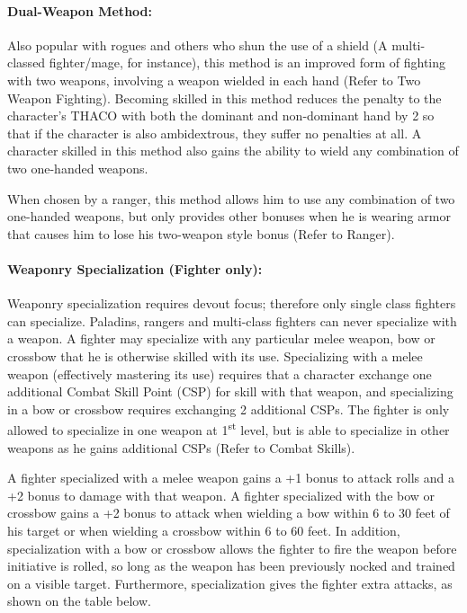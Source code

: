 \begin{multicols}{2}
\paragraph{Dual-Weapon Method:} Also popular with rogues and others who shun the use of a shield (A multi-classed fighter/mage, for instance), this method is an improved form of fighting with two weapons, involving a weapon wielded in each hand (Refer to Two Weapon Fighting).  Becoming skilled in this method reduces the penalty to the character's THACO with both the dominant and non-dominant hand by 2 so that if the character is also ambidextrous, they suffer no penalties at all.  A character skilled in this method also gains the ability to wield any combination of two one-handed weapons.

When chosen by a ranger, this method allows him to use any combination of two one-handed weapons, but only provides other bonuses when he is wearing armor that causes him to lose his two-weapon style bonus (Refer to Ranger).
 
\paragraph{Weaponry Specialization (Fighter only):} Weaponry specialization requires devout focus; therefore only single class fighters can specialize.  Paladins, rangers and multi-class fighters can never specialize with a weapon.  A fighter may specialize with any particular melee weapon, bow or crossbow that he is otherwise skilled with its use.  Specializing with a melee weapon (effectively mastering its use) requires that a character exchange one additional Combat Skill Point (CSP) for skill with that weapon, and specializing in a bow or crossbow requires exchanging 2 additional CSPs.  The fighter is only allowed to specialize in one weapon at 1\textsuperscript{st} level, but is able to specialize in other weapons as he gains additional CSPs (Refer to Combat Skills).

A fighter specialized with a melee weapon gains a +1 bonus to attack rolls and a +2 bonus to damage with that weapon.  A fighter specialized with the bow or crossbow gains a +2 bonus to attack when wielding a bow within 6 to 30 feet of his target or when wielding a crossbow within 6 to 60 feet.  In addition, specialization with a bow or crossbow allows the fighter to fire the weapon before initiative is rolled, so long as the weapon has been previously nocked and trained on a visible target.   Furthermore, specialization gives the fighter extra attacks, as shown on the table below.

\end{multicols}

